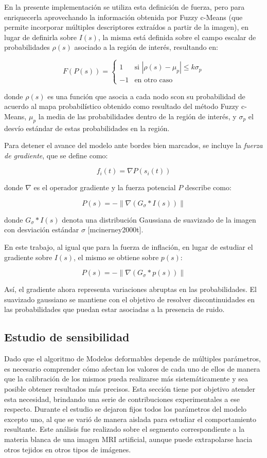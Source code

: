 En la presente implementación se utiliza esta definición de fuerza, pero para enriquecerla aprovechando la información obtenida por Fuzzy c-Means (que permite incorporar múltiples descriptores extraídos a partir de la imagen), en lugar de definirla sobre $I(s)$, la misma está definida sobre el campo escalar de probabilidades $\rho(s)$ asociado a la región de interés, resultando en:

$$ F(P(s)) = \begin{cases} 1 & \text{si } \left|\rho(s) - \mu_{p} \right| \leq k\sigma_{p} \\ -1 & \text{en otro caso} \end{cases}  $$

donde $\rho(s)$ es una función que asocia a cada nodo scon su probabilidad de acuerdo al mapa probabilístico obtenido como resultado del método Fuzzy c-Means, $\mu_{p}$ la media de las probabilidades dentro de la región de interés, y $\sigma_{p}$ el desvío estándar de estas probabilidades en la región.

Para detener el avance del modelo ante bordes bien marcados, se incluye la \emph{fuerza de gradiente}, que se define como:

$$ f_{i}(t) = \nabla P(s_{i}(t)) $$

donde $\nabla$ es el operador gradiente y la fuerza potencial $P$ describe como:

$$ P(s) = - \left\| \nabla(G_{\sigma} * I(s)) \right\| $$ \label{eq:zz}

donde $G_{\sigma} * I(s)$ denota una distribución Gaussiana de suavizado de la imagen con desviación estándar $\sigma$ [mcinerney2000t].

En este trabajo, al igual que para la fuerza de inflación, en lugar de estudiar el gradiente sobre $I(s)$, el mismo se obtiene sobre $p(s)$:

$$ P(s) = - \left\| \nabla(G_{\sigma} * p(s)) \right\| $$

Así, el gradiente ahora representa variaciones abruptas en las probabilidades. El suavizado gaussiano se mantiene con el objetivo de resolver discontinuidades en las probabilidades que puedan estar asociadas a la presencia de ruido.

\subsection{Estudio de sensibilidad}\label{section:estudio_de_sensibilidad}
Dado que el algoritmo de Modelos deformables depende de múltiples parámetros, es necesario comprender cómo afectan los valores de cada uno de ellos de manera que la calibración de los mismos pueda realizarse más sistemáticamente y sea posible obtener resultados más precisos. Esta sección tiene por objetivo atender esta necesidad, brindando una serie de contribuciones experimentales a ese respecto. Durante el estudio se dejaron fijos todos los parámetros del modelo excepto uno, al que se varió de manera aislada para estudiar el comportamiento resultante. Este análisis fue realizado sobre el segmento correspondiente a la materia blanca de una imagen MRI artificial, aunque puede extrapolarse hacia otros tejidos en otros tipos de imágenes.

